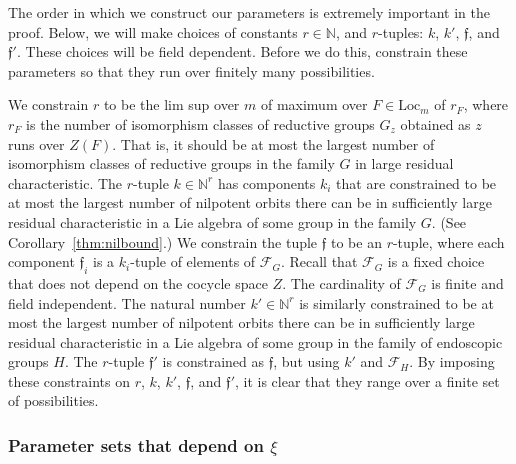 \documentclass[12pt]{amsart}
\newcommand{\ring}[1]{{\mathbb #1}}
\def\s{{\mathfrak{f}}}
\newcommand{\cF}{\mathcal{F}}
\newcommand{\Loc}{\mathrm{Loc}}
\theoremstyle{plain}
\theoremstyle{definition}
\begin{document}
The order in which we construct our parameters is extremely important
in the proof.  Below, we will make choices of constants
$r\in\ring{N}$, and $r$-tuples: $k$, $k'$, $\s$,
and $\s'$.  These choices will be field dependent.  Before we do this,
constrain these parameters so that they run over finitely many
possibilities.

We constrain $r$ to be the lim sup over $m$ of maximum over
$F\in\Loc_m$ of $r_F$, where $r_F$ is the number of isomorphism
classes of reductive groups $G_z$ obtained as $z$ runs over $Z(F)$.
That is, it should be at most the largest number of isomorphism
classes of reductive groups in the family $G$ in large residual
characteristic.  The $r$-tuple $k\in\ring{N}^r$ has components $k_i$
that are constrained to be at most the largest number of nilpotent
orbits there can be in sufficiently large residual characteristic in a
Lie algebra of some group in the family $G$.  (See
Corollary~\ref{thm:nilbound}.) We constrain the tuple $\s$ to be an
$r$-tuple, where each component $\s_i$ is a $k_i$-tuple of elements of
$\cF_G$. Recall that $\cF_G$ is a fixed choice that does not depend on
the cocycle space $Z$.  The cardinality of $\cF_G$ is finite and field
independent.  The natural number $k'\in\ring{N}^r$ is similarly
constrained to be at most the largest number of nilpotent orbits there
can be in sufficiently large residual characteristic in a Lie algebra
of some group in the family of endoscopic groups $H$.  The $r$-tuple
$\s'$ is constrained as $\s$, but using $k'$ and $\cF_H$.  By imposing
these constraints on $r$, $k$, $k'$, $\s$, and $\s'$, it is clear that
they range over a finite set of possibilities.




\subsubsection{Parameter sets that depend on $\xi$}
\end{document}

